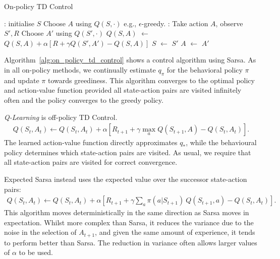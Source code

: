 \documentclass{article}
\newcommand*\Let[2]{\State #1 $\gets$ #2}
\newcommand{\ix}[1]{%
  \leavevmode %
  \marginpar{\small\emph{#1}}%
}
\begin{document}
\begin{algorithm}[H]
	\caption{On-policy TD Control
		\label{alg:on_policy_td_control}}
	\begin{algorithmic}[1]
		\Require{
			\textbf{Parameters:} \Statex \hspace{\algorithmicindent} step size $\alpha \in (0, 1]$
			\Statex \hspace{\algorithmicindent} small $\epsilon > 0$ 
		}
	    \Statex 
		\Statex
		: 
		\State initialise $S$
		\State Choose $A$ using $Q(S, \cdot)$ e.g., $\epsilon$-greedy. 
		:
			\State Take action $A$, observe $S', R$
			\State Choose $A'$ using $Q(S', \cdot)$
			\Let{$Q(S, A)$}{$Q(S, A) + \alpha [R + \gamma Q(S', A') - Q(S, A)]$}
			\Let{$S$}{$S'$}
			\Let{$A$}{$A'$}
		\EndLoop
		\EndLoop
	\end{algorithmic}
\end{algorithm}

Algorithm~\ref{alg:on_policy_td_control} shows a control algorithm using Sarsa. As in all on-policy methods, we continually estimate $q_\pi$ for the behavioral policy $\pi$ and update $\pi$ towards greediness. This algorithm converges to the optimal policy and action-value function provided all state-action pairs are visited infinitely often and the policy converges to the greedy policy. 

\ix{Q-Learning}\emph{Q-Learning} is off-policy TD Control. 
\begin{align}
Q(S_t, A_t) \leftarrow Q(S_t, A_t) + \alpha [R_{t+1} + \gamma \max_a Q(S_{t+1}, A) - Q(S_t, A_t)].
\end{align}
The learned action-value function directly approximates $q_*$, while the behavioural policy determines which state-action pairs are visited. As usual, we require that all state-action pairs are visited for correct convergence. 

\ix{Expected Sarsa}Expected Sarsa instead uses the expected value over the successor state-action pairs:
\begin{align}
Q(S_t, A_t) \leftarrow Q(S_t, A_t) + \alpha [R_{t+1} + \gamma \sum_a \pi(a | S_{t+1})\ Q(S_{t+1}, a) - Q(S_t, A_t)].
\end{align}
This algorithm moves deterministically in the same direction as Sarsa moves in expectation. Whilst more complex than Sarsa, it reduces the variance due to the noise in the selection of $A_{t+1}$, and given the same amount of experience, it tends to perform better than Sarsa. The reduction in variance often allows larger values of $\alpha$ to be used.  
\end{document}
